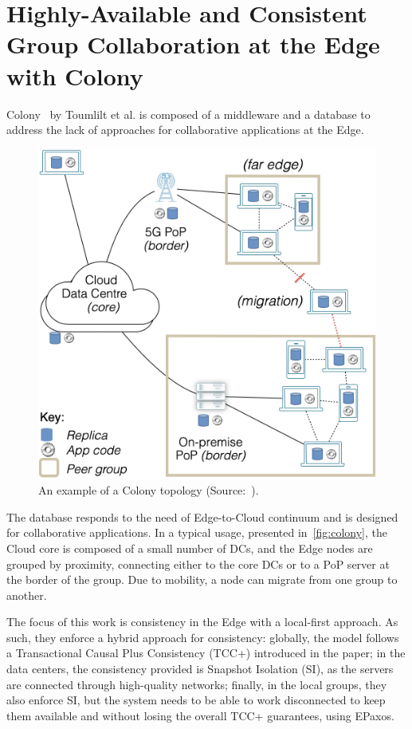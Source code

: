 \section{Highly-Available and Consistent Group Collaboration at the
  Edge with Colony~\cite{TSS21}}
\label{sec:TSS21}

Colony~\cite{TSS21, Toumlilt21} by Toumlilt et al. is composed of a
middleware and a database to address the lack of approaches for
collaborative applications at the Edge.
%


\begin{figure}[htbp]
  \centering  \includegraphics[width=.6\linewidth]{figs/png/colony-topology}
  \caption{An example of a Colony topology (Source:~\cite{Toumlilt21}).}
  \label{fig:colony}
\end{figure}

The database responds to the need of Edge-to-Cloud continuum and is
designed for collaborative applications.
%
In a typical usage, presented in~\autoref{fig:colony}, the Cloud core
is composed of a small number of \acrshort{DC}s, and the Edge nodes
are grouped by proximity, connecting either to the core \acrshort{DC}s
or to a PoP server at the border of the group.
%
Due to mobility, a node can migrate from one group to another.


The focus of this work is consistency in the Edge with a local-first
approach.
%
As such, they enforce a hybrid approach for consistency: globally, the
model follows a Transactional Causal Plus Consistency (TCC+)
introduced in the paper; in the data centers, the consistency provided
is Snapshot Isolation (SI), as the servers are connected through
high-quality networks; finally, in the local groups, they also enforce
SI, but the system needs to be able to work disconnected to keep them
available and without losing the overall TCC+ guarantees, using
EPaxos.


